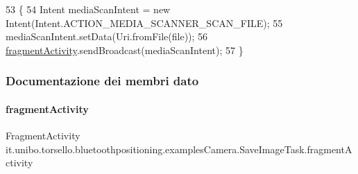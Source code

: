 \begin{DoxyCode}
53                                            \{
54         Intent mediaScanIntent = \textcolor{keyword}{new} Intent(Intent.ACTION\_MEDIA\_SCANNER\_SCAN\_FILE);
55         mediaScanIntent.setData(Uri.fromFile(file));
56         \hyperlink{classit_1_1unibo_1_1torsello_1_1bluetoothpositioning_1_1examplesCamera_1_1SaveImageTask_a020c67ae36b7f908c900da193d9cd110_a020c67ae36b7f908c900da193d9cd110}{fragmentActivity}.sendBroadcast(mediaScanIntent);
57     \}
\end{DoxyCode}


\subsubsection{Documentazione dei membri dato}
\hypertarget{classit_1_1unibo_1_1torsello_1_1bluetoothpositioning_1_1examplesCamera_1_1SaveImageTask_a020c67ae36b7f908c900da193d9cd110_a020c67ae36b7f908c900da193d9cd110}{}\label{classit_1_1unibo_1_1torsello_1_1bluetoothpositioning_1_1examplesCamera_1_1SaveImageTask_a020c67ae36b7f908c900da193d9cd110_a020c67ae36b7f908c900da193d9cd110} 
\paragraph{\texorpdfstring{fragment\+Activity}{fragmentActivity}}
{\footnotesize\ttfamily Fragment\+Activity it.\+unibo.\+torsello.\+bluetoothpositioning.\+examples\+Camera.\+Save\+Image\+Task.\+fragment\+Activity\hspace{0.3cm}{\ttfamily [package]}}

\hypertarget{classit_1_1unibo_1_1torsello_1_1bluetoothpositioning_1_1examplesCamera_1_1SaveImageTask_a908ad84901185def0257ea5288f64c3c_a908ad84901185def0257ea5288f64c3c}{}\label{classit_1_1unibo_1_1torsello_1_1bluetoothpositioning_1_1examplesCamera_1_1SaveImageTask_a908ad84901185def0257ea5288f64c3c_a908ad84901185def0257ea5288f64c3c} 
